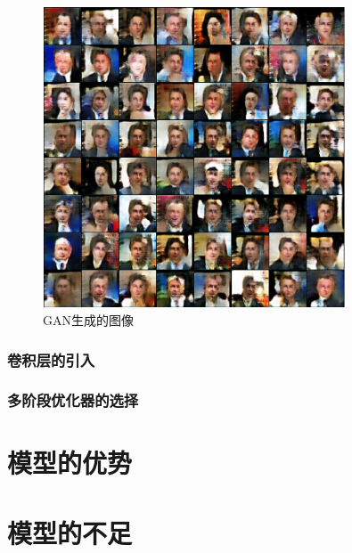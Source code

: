 \documentclass[UTF8]{ctexart}
\begin{document}
\begin{figure}[H]
\centering
\includegraphics[width=0.8\textwidth]{./images/GAN_tanh.png}
\caption{GAN生成的图像}
\label{fig:GAN_tanh}
\end{figure}
\subsubsection{卷积层的引入}

\subsubsection{多阶段优化器的选择}

\section{模型的优势}


\section{模型的不足}





\end{document}
